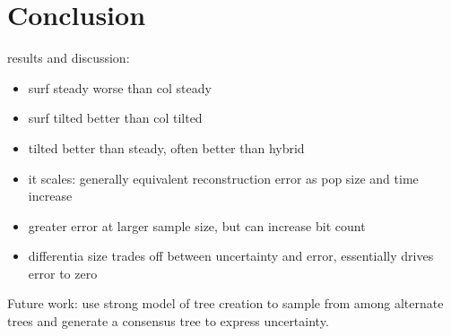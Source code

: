 \section{Conclusion} \label{sec:conclusion}

results and discussion:
\begin{itemize}
    \item surf steady worse than col steady
    \item surf tilted better than col tilted
    \item tilted better than steady, often better than hybrid
    \item it scales: generally equivalent reconstruction error as pop size and time increase
    \item greater error at larger sample size, but can increase bit count
    \item differentia size trades off between uncertainty and error, essentially drives error to zero
\end{itemize}

Future work: use strong model of tree creation to sample from among alternate trees and generate a consensus tree to express uncertainty. 